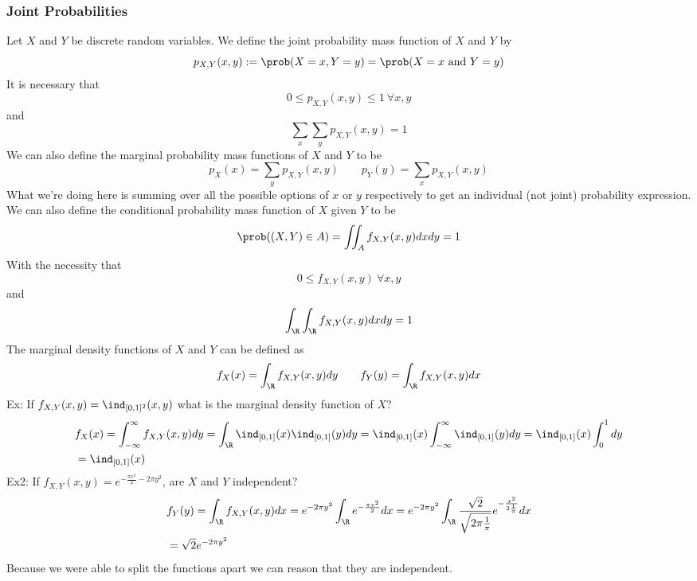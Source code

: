 \subsubsection{Joint Probabilities}
Let $X$ and $Y$ be discrete random variables. We define the joint probability mass function of $X$ and $Y$ by
\[p_{X,Y}(x,y):=\prob(X=x,Y=y)=\prob(X=x\text{ and }Y=y)\]
It is necessary that
\[0\leq p_{X,Y}(x,y)\leq 1\ \forall x,y\]
and
\[\sum_x\sum_y p_{X,Y}(x,y)=1\]
We can also define the marginal probability mass functions of $X$ and $Y$ to be
\[p_X(x)=\sum_y p_{X,Y}(x,y)\quad\quad p_Y(y)=\sum_x p_{X,Y}(x,y)\]
What we're doing here is summing over all the possible options of $x$ or $y$ respectively to get an individual (not joint) probability expression.\\
We can also define the conditional probability mass function of $X$ given $Y$ to be
\[\prob((X,Y)\in A)=\iint_A f_{X,Y}(x,y)dxdy=1\]
With the necessity that
\[0\leq f_{X,Y}(x,y)\ \forall x,y\]
and
\[\int_\R\int_\R f_{X,Y}(x,y)dxdy=1\]
The marginal density functions of $X$ and $Y$ can be defined as
\[f_X(x)=\int_\R f_{X,Y}(x,y)dy\quad\quad f_Y(y)=\int_\R f_{X,Y}(x,y)dx\]
Ex: If $f_{X,Y}(x,y)=\ind_{[0,1]^2}(x,y)$ what is the marginal density function of $X$?
\begin{align*}
    &f_X(x)=\int_{-\infty}^\infty f_{X,Y}(x,y)dy=\int_\R\ind_{[0,1]}(x)\ind_{[0,1]}(y)dy=\ind_{[0,1]}(x)\int_{-\infty}^\infty\ind_{[0,1]}(y)dy=\ind_{[0,1]}(x)\int_0^1 dy\\
    &=\ind_{[0,1]}(x)
\end{align*}
Ex2: If $f_{X,Y}(x,y)=e^{-\frac{\pi x^2}{2}-2\pi y^2}$, are $X$ and $Y$ independent?
\begin{align*}
    &f_Y(y)=\int_\R f_{X,Y}(x,y)dx=e^{-2\pi y^2}\int_\R e^{-\frac{\pi x^2}{2}}dx=e^{-2\pi y^2}\int_\R\frac{\sqrt{2}}{\sqrt{2\pi\frac{1}{\pi}}}e^{-\frac{x^2}{2\frac{1}{\pi}}}dx\\
    &=\sqrt{2}e^{-2\pi y^2}
\end{align*}
Because we were able to split the functions apart we can reason that they are independent.
